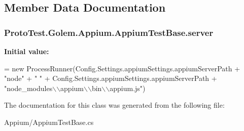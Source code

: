 \subsection{Member Data Documentation}
\hypertarget{class_proto_test_1_1_golem_1_1_appium_1_1_appium_test_base_a1b87041560678a6e29b0bc6e19a093b7}{
\subsubsection[{server}]{ Proto\-Test.\-Golem.\-Appium.\-Appium\-Test\-Base.\-server}}\label{class_proto_test_1_1_golem_1_1_appium_1_1_appium_test_base_a1b87041560678a6e29b0bc6e19a093b7}
{\bfseries Initial value\-:}
\begin{DoxyCode}
= \textcolor{keyword}{new} ProcessRunner(Config.Settings.appiumSettings.appiumServerPath + \textcolor{stringliteral}{"node"} + \textcolor{stringliteral}{" "} +
                                                     Config.Settings.appiumSettings.appiumServerPath +
                                                     \textcolor{stringliteral}{"node\_modules\(\backslash\)\(\backslash\)appium\(\backslash\)\(\backslash\)bin\(\backslash\)\(\backslash\)appium.js"})
\end{DoxyCode}


The documentation for this class was generated from the following file\-:\begin{DoxyCompactItemize}
\item 
Appium/Appium\-Test\-Base.\-cs\end{DoxyCompactItemize}
